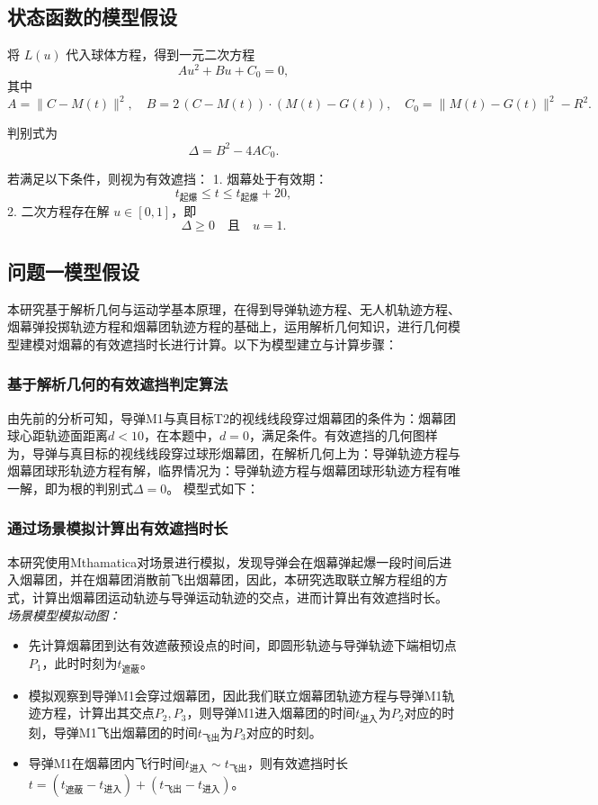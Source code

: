 \documentclass{article}
\begin{document}
\subsection{状态函数的模型假设}
将 $L(u)$ 代入球体方程，得到一元二次方程
\[
A u^2 + B u + C_0 = 0,
\]
其中
\[
A = \|C - M(t)\|^2, \quad
B = 2\,(C - M(t)) \cdot (M(t) - G(t)), \quad
C_0 = \|M(t) - G(t)\|^2 - R^2.
\]

判别式为
\[
\Delta = B^2 - 4AC_0.
\]

若满足以下条件，则视为有效遮挡：
1. 烟幕处于有效期：
\[
t_{\text{起爆}} \leq t \leq t_{\text{起爆}} + 20,
\]
2. 二次方程存在解 $u \in [0,1]$，即
\[
\Delta \geq 0 \quad \text{且} \quad u = 1.
\]
\subsection{问题一模型假设}

本研究基于解析几何与运动学基本原理，在得到导弹轨迹方程、无人机轨迹方程、烟幕弹投掷轨迹方程和烟幕团轨迹方程的基础上，运用解析几何知识，进行几何模型建模对烟幕的有效遮挡时长进行计算。以下为模型建立与计算步骤：

\subsubsection{基于解析几何的有效遮挡判定算法}

由先前的分析可知，导弹M1与真目标T2的视线线段穿过烟幕团的条件为：烟幕团球心距轨迹面距离$d<10$，在本题中，$d = 0$，满足条件。有效遮挡的几何图样为，导弹与真目标的视线线段穿过球形烟幕团，在解析几何上为：导弹轨迹方程与烟幕团球形轨迹方程有解，临界情况为：导弹轨迹方程与烟幕团球形轨迹方程有唯一解，即为根的判别式$\Delta  = 0$。
模型式如下：
\subsubsection{通过场景模拟计算出有效遮挡时长}
本研究使用Mthamatica对场景进行模拟，发现导弹会在烟幕弹起爆一段时间后进入烟幕团，并在烟幕团消散前飞出烟幕团，因此，本研究选取联立解方程组的方式，计算出烟幕团运动轨迹与导弹运动轨迹的交点，进而计算出有效遮挡时长。
\textit{场景模型模拟动图：}

\begin{itemize}
    \item 先计算烟幕团到达有效遮蔽预设点的时间，即圆形轨迹与导弹轨迹下端相切点$P_1$，此时时刻为$t_\text{遮蔽}$。
    \item 模拟观察到导弹M1会穿过烟幕团，因此我们联立烟幕团轨迹方程与导弹M1轨迹方程，计算出其交点$P_2,P_3$，则导弹M1进入烟幕团的时间$t_{\text{进入}}$为$P_2$对应的时刻，导弹M1飞出烟幕团的时间$t_{\text{飞出}}$为$P_3$对应的时刻。
    \item 导弹M1在烟幕团内飞行时间$t_{\text{进入}} \sim t_{\text{飞出}}$，则有效遮挡时长$t =(t_\text{遮蔽}- t_\text{进入}) + (t_{\text{飞出}} - t_{\text{进入}})$。
\end{itemize}
\end{document}
